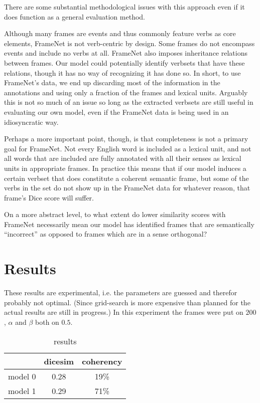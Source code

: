 \documentclass{article} %
\begin{document}
There are some substantial methodological issues with this approach even if it does function as a general evaluation method. 

Although many frames are events and thus commonly feature verbs as core elements, FrameNet is not verb-centric by design. Some frames do not encompass events and include no verbs at all.
FrameNet also imposes inheritance relations between frames. Our model could potentially identify verbsets that have these relations, though it has no way of recognizing it has done so.
In short, to use FrameNet's data, we end up discarding most of the information in the annotations and using only a fraction of the frames and lexical units. Arguably this is not so much of an issue so long as the extracted verbsets are still useful in evaluating our own model, even if the FrameNet data is being used in an idiosyncratic way.

Perhaps a more important point, though, is that completeness is not a primary goal for FrameNet. Not every English word is included as a lexical unit, and not all words that are included are fully annotated with all their senses as lexical units in appropriate frames.
In practice this means that if our model induces a certain verbset that does constitute a coherent semantic frame, but some of the verbs in the set do not show up in the FrameNet data for whatever reason, that frame's Dice score will suffer.
% 




On a more abstract level, to what extent do lower similarity scores with FrameNet necessarily mean our model has identified frames that are semantically ``incorrect'' as opposed to frames which are in a sense orthogonal?





\section{Results}
These results are experimental, i.e. the parameters are guessed and therefor probably not optimal. (Since grid-search is more expensive than planned for the actual results are still in progress.) In this experiment the frames were put on $200$, $\alpha$ and $\beta$ both on $0.5$.\\
\begin{table}[h]
\begin{tabular}{|l||c|c|}
  \hline
  &dicesim&coherency\\
  \hline
  \hline
  model 0& 0.28&19\%  \\
  \hline
  model 1&0.29 &71\%  \\
  \hline
\end{tabular}
\caption{results}
\label{results}
\end{table}
\end{document}
